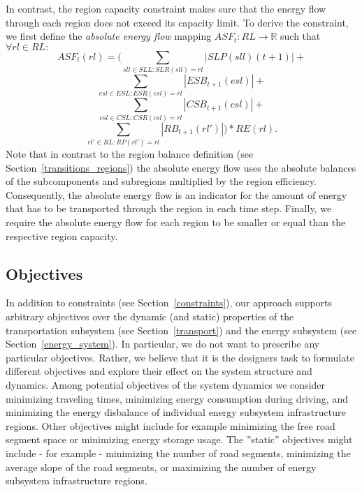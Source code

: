 In contrast, the region capacity constraint makes sure that the energy flow through each region does not exceed its capacity limit. To derive the constraint, we first define the \textit{absolute energy flow} mapping $ASF_t: RL \rightarrow \mathbb{R}$ such that $\forall rl \in RL:$
\[
	ASF_t(rl) = (\sum_{sll \in SLL: SLR(sll) = rl} |SLP(sll)(t+1)| +
\]
\[
	\sum_{esl \in ESL: ESR(esl) = rl} |ESB_{t+1}(esl)| +
\]
\[
	\sum_{csl \in CSL: CSR(csl) = rl} |CSB_{t+1}(csl)| +
\]
\[
	\sum_{rl' \in RL: RP(rl') = rl} |RB_{t+1}(rl')|) * RE(rl) \textrm{.}
\]
Note that in contrast to the region balance definition (see Section~\ref{transitions_regions}) the absolute energy flow uses the absolute balances of the subcomponents and subregions multiplied by the region efficiency. Consequently, the absolute energy flow is an indicator for the amount of energy that has to be transported through the region in each time step. Finally, we require the absolute energy flow for each region to be smaller or equal than the respective region capacity.

\subsection{Objectives}
\label{objectives}

In addition to constraints (see Section~\ref{constraints}), our approach supports arbitrary objectives over the dynamic (and static) properties of the transportation subsystem (see Section~\ref{transport}) and the energy subsystem (see Section~\ref{energy_system}). In particular, we do not want to prescribe any particular objectives. Rather, we believe that it is the designers task to formulate different objectives and explore their effect on the system structure and dynamics. Among potential objectives of the system dynamics we consider minimizing traveling times, minimizing energy consumption during driving, and minimizing the energy disbalance of individual energy subsystem infrastructure regions. Other objectives might include for example minimizing the free road segment space or minimizing energy storage usage. The ''static'' objectives might include - for example - minimizing the number of road segments, minimizing the average slope of the road segments, or maximizing the number of energy subsystem infrastructure regions.